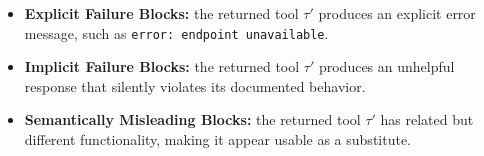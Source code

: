\documentclass{llmxive}
\begin{document}
    

\begin{itemize}[topsep=2pt, partopsep=3pt, leftmargin=*, itemsep=-3pt]
    \item \textbf{Explicit Failure Blocks:}
    the returned tool $\tau'$ produces an explicit error message, such as \texttt{error: endpoint unavailable}.

    \item \textbf{Implicit Failure Blocks:}
    the returned tool $\tau'$ produces an unhelpful response that silently violates its documented behavior.

    \item \textbf{Semantically Misleading Blocks:}
    the returned tool $\tau'$ has related but different functionality, making it appear usable as a substitute.
\end{itemize}


\end{document}
